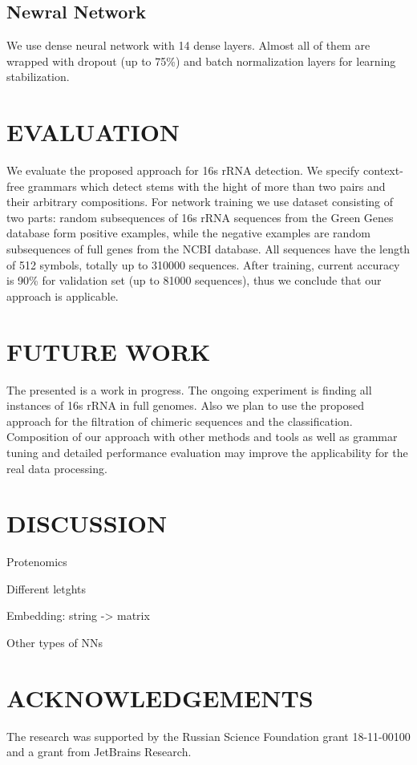 \documentclass[a4paper,twoside]{article}
\begin{document}
\subsection{Newral Network}

\noindent We use dense neural network with 14 dense layers.
Almost all of them are wrapped with dropout (up to 75\%) and batch normalization layers for learning stabilization.

\section{\uppercase{Evaluation}}
\label{sec:evaluation}

\noindent We evaluate the proposed approach for 16s rRNA detection.
We specify context-free grammars which detect stems with the hight of more than two pairs and their arbitrary compositions.
For network training we use dataset consisting of two parts: random subsequences of 16s rRNA sequences from the Green Genes database form positive examples, while the negative examples are random subsequences of full genes from the NCBI database.
All sequences have the length of 512 symbols, totally up to 310000 sequences.
After training, current accuracy is 90\% for validation set (up to 81000 sequences), thus we conclude that our approach is applicable.

\section{\uppercase{Future Work}}
\label{sec:FutureWork}

\noindent The presented is a work in progress. 
The ongoing experiment is finding all instances of 16s rRNA in full genomes.
Also we plan to use the proposed approach for the filtration of chimeric sequences and the classification.
Composition of our approach with other methods and tools as well as grammar tuning and detailed performance evaluation may improve the applicability for the real data processing.


\section{\uppercase{Discussion}}
\label{sec:Discussion}

Protenomics

Different letghts

Embedding: string -> matrix

Other types of NNs



\section*{\uppercase{Acknowledgements}}

\noindent The research was supported by the Russian Science Foundation grant 18-11-00100 and a grant from JetBrains Research.


\vfill

{\small
}


\vfill
\end{document}
